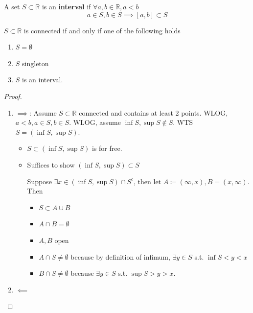 \begin{definition}
    A set $S \subset \mathbb{R}$ is an \textbf{interval} if 
    $\forall a, b \in \mathbb{R}, a < b$
    \[
        a \in S, b \in S \implies [a, b] \subset S
    \]
\end{definition}

\begin{theorem}
    \label{theorem:connected-sets-in-R}
    $S \subset \mathbb{R}$ is connected 
    if and only if one of the following holds
    \begin{enumerate}
        \item $S = \emptyset$ 
        \item $S$ singleton
        \item $S$ is an interval.
    \end{enumerate}
\end{theorem}

\begin{proof}
    \begin{enumerate}
        \item $\implies$: 
            Assume $S \subset \mathbb{R}$ connected and contains 
            at least 2 points. 
            WLOG, $a < b, a \in S, b \in S$. 
            WLOG, assume $\inf S, \sup S \notin S $. 
            WTS $S = (\inf S, \sup S)$.
            \begin{itemize}
                \item $S \subset (\inf S, \sup S)$ is for free. 
                \item Suffices to show $(\inf S, \sup S) \subset S$
                \medskip 

                Suppose $\exists x \in (\inf S, \sup S) \cap S^c$, 
                then let $A \coloneq (\infty, x), B = (x, \infty)$. 
                Then
                \begin{itemize}
                    \item $S \subset A \cup B$
                    \item $A \cap B = \emptyset$
                    \item $A, B$ open 
                    \item $A \cap S \neq \emptyset$ because by definition of 
                    infimum, $\exists y \in S$ s.t. 
                    $\inf S < y < x$
                    \item $B \cap S \neq \emptyset$ because $\exists y \in S$
                    s.t. $\sup S > y > x$.
                \end{itemize} 
            \end{itemize} 
            \item $\impliedby$ 
            \label{proof:connected-sets-in-R}
    \end{enumerate}
\end{proof}

